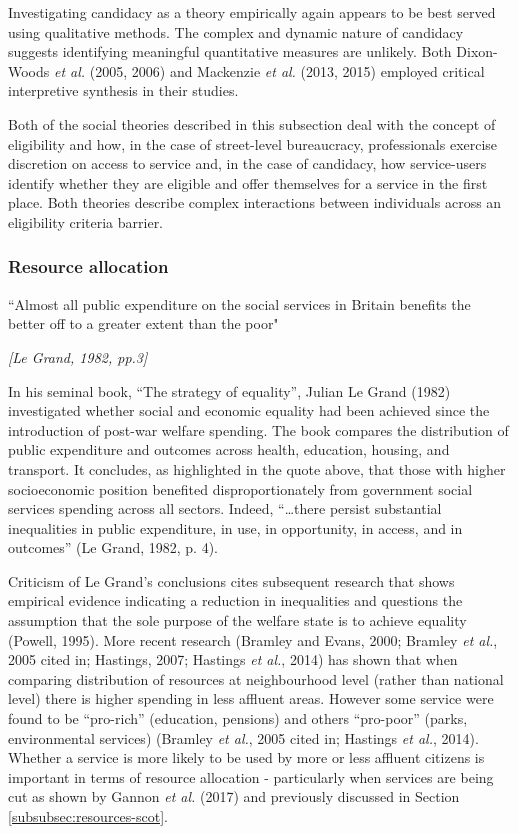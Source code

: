 \documentclass[12pt,a4paper,oneside,table]{report}
\begin{document}
Investigating candidacy as a theory empirically again appears to be best
served using qualitative methods. The complex and dynamic nature of
candidacy suggests identifying meaningful quantitative measures are
unlikely. Both Dixon-Woods \textit{et al.} (2005, 2006) and Mackenzie
\textit{et al.} (2013, 2015) employed critical interpretive synthesis in
their studies.

Both of the social theories described in this subsection deal with the
concept of eligibility and how, in the case of street-level bureaucracy,
professionals exercise discretion on access to service and, in the case
of candidacy, how service-users identify whether they are eligible and
offer themselves for a service in the first place. Both theories
describe complex interactions between individuals across an eligibility
criteria barrier.

\subsubsection{Resource allocation}\label{subsubsec:theory-resources}

\epigraph{``Almost all public expenditure on the social services in Britain benefits the better off to a greater extent than the poor"}{\textit{[Le Grand, 1982, pp.3]}}

In his seminal book, ``The strategy of equality'', Julian Le Grand
(1982) investigated whether social and economic equality had been
achieved since the introduction of post-war welfare spending. The book
compares the distribution of public expenditure and outcomes across
health, education, housing, and transport. It concludes, as highlighted
in the quote above, that those with higher socioeconomic position
benefited disproportionately from government social services spending
across all sectors. Indeed, ``\ldots{}there persist substantial
inequalities in public expenditure, in use, in opportunity, in access,
and in outcomes'' (Le Grand, 1982, p. 4).

Criticism of Le Grand's conclusions cites subsequent research that shows
empirical evidence indicating a reduction in inequalities and questions
the assumption that the sole purpose of the welfare state is to achieve
equality (Powell, 1995). More recent research (Bramley and Evans, 2000;
Bramley \emph{et al.}, 2005 cited in; Hastings, 2007; Hastings \emph{et
al.}, 2014) has shown that when comparing distribution of resources at
neighbourhood level (rather than national level) there is higher
spending in less affluent areas. However some service were found to be
``pro-rich'' (education, pensions) and others ``pro-poor'' (parks,
environmental services) (Bramley \emph{et al.}, 2005 cited in; Hastings
\emph{et al.}, 2014). Whether a service is more likely to be used by
more or less affluent citizens is important in terms of resource
allocation - particularly when services are being cut as shown by Gannon
\textit{et al.} (2017) and previously discussed in Section
\ref{subsubsec:resources-scot}.
\end{document}
